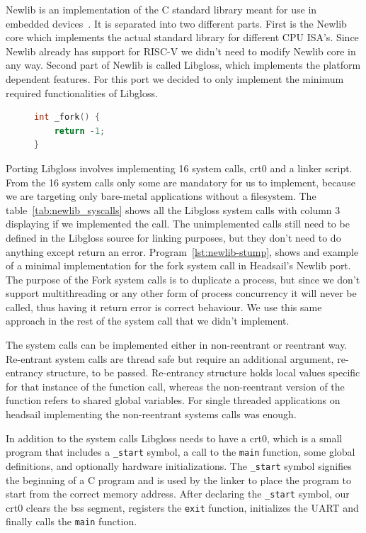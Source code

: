 \documentclass[12pt,a4paper,english
]{tunithesis}
\begin{document}
Newlib is an implementation of the C standard library meant for use in embedded devices~\parencite{newlib}. It is separated into two different parts. First is the Newlib core which implements the actual standard library for different CPU ISA's. Since Newlib already has support for RISC-V we didn't need to modify Newlib core in any way. Second part of Newlib is called Libgloss, which implements the platform dependent features. For this port we decided to only implement the minimum required functionalities of Libgloss.

\begin{figure}
\begin{lstlisting}[language=C, caption={Minimal implementation of the fork() syscall in Newlib Libgloss}, label={lst:newlib-stump}]
int _fork() {
    return -1;
}
\end{lstlisting}
\end{figure}

Porting Libgloss involves implementing 16 system calls, crt0 and a linker script. From the 16 system calls only some are mandatory for us to implement, because we are targeting only bare-metal applications without a filesystem. The table~\ref{tab:newlib_syscalls} shows all the Libgloss system calls with column 3 displaying if we implemented the call. The unimplemented calls still need to be defined in the Libgloss source for linking purposes, but they don't need to do anything except return an error. Program~\ref{lst:newlib-stump}, shows and example of a minimal implementation for the fork system call in Headsail's Newlib port. The purpose of the Fork system calls is to  duplicate a process, but since we don't support multithreading or any other form of process concurrency it will never be called, thus having it return error is correct behaviour. We use this same approach in the rest of the system call that we didn't implement.

The system calls can be implemented either in non-reentrant or reentrant way. Re-entrant system calls are thread safe but require an additional argument, re-entrancy structure, to be passed. Re-entrancy structure holds local values specific for that instance of the function call, whereas the non-reentrant version of the function refers to shared global variables. For single threaded applications on headsail implementing the non-reentrant systems calls was enough.~\parencite{bennett2010porting}

In addition to the system calls Libgloss needs to have a crt0, which is a small program that includes a \texttt{\_start} symbol, a call to the \texttt{main} function, some global definitions, and optionally hardware initializations. The \texttt{\_start} symbol signifies the beginning of a C program and is used by the linker to place the program to start from the correct memory address. After declaring the \texttt{\_start} symbol, our crt0 clears the bss segment, registers the \texttt{exit} function, initializes the UART and finally calls the \texttt{main} function.
\end{document}
